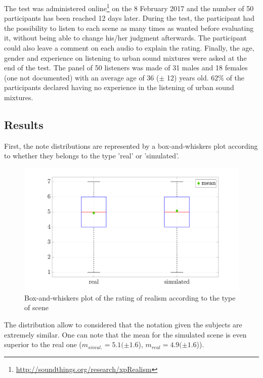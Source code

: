 \documentclass[11pt,letter]{article}
\begin{document}
The test was administered online\footnote{\url{http://soundthings.org/research/xpRealism}} on the 8 February 2017 and the number of 50 participants has been reached 12 days later. During the test, the participant had the possibility to listen to each scene as many times as wanted before evaluating it, without being able to change his/her judgment afterwards. The participant could also leave a comment on each audio to explain the rating. Finally, the age, gender and experience on listening to urban sound mixtures were asked at the end of the test. The panel of 50 listeners was made of 31 males and 18 females (one not documented) with an average age of 36 ($\pm$ 12) years old. $62\%$ of the participants declared having no experience in the listening of urban sound mixtures.\\




\subsection{Results}

First, the note distributions are represented by a box-and-whiskers plot according to whether they belongs to the type 'real' or 'simulated'. 
\begin{figure}[hbtp]
\centering
\includegraphics[width=.6\linewidth]{./pictures/testPerceptif_boxplotType_EN.pdf}
\caption{Box-and-whiskers plot of the rating of realism according to the type of scene}
\label{fig:boxplot_real_simul}
\end{figure}

The distribution allow to considered that the notation given the subjects are extremely similar. One can note that the mean for the simulated scene is even superior to the real one ($m_{simul.} = 5.1 (\pm 1.6$), $ m_{real} = 4.9 (\pm 1.6$)). 
\end{document}
